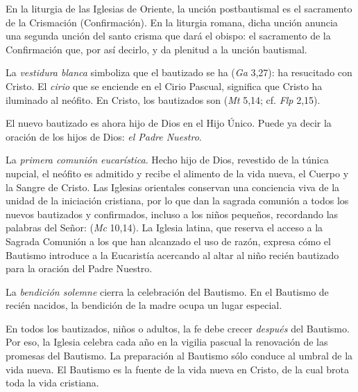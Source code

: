 \begin{ccebody}
 En la liturgia de las Iglesias de Oriente, la unción postbautismal es el sacramento de la Crismación (Confirmación). En la liturgia romana, dicha unción anuncia una segunda unción del santo crisma que dará el obispo: el sacramento de la Confirmación que, por así decirlo,  y da plenitud a la unción bautismal.

 La \textit{vestidura blanca} simboliza que el bautizado se ha  (\textit{Ga} 3,27): ha resucitado con Cristo. El \textit{cirio} que se enciende en el Cirio Pascual, significa que Cristo ha iluminado al neófito. En Cristo, los bautizados son  (\textit{Mt} 5,14; cf. \textit{Flp} 2,15).

El nuevo bautizado es ahora hijo de Dios en el Hijo Único. Puede ya decir la oración de los hijos de Dios: \textit{el Padre Nuestro}.

 La \textit{primera comunión eucarística}. Hecho hijo de Dios, revestido de la túnica nupcial, el neófito es admitido  y recibe el alimento de la vida nueva, el Cuerpo y la Sangre de Cristo. Las Iglesias orientales conservan una conciencia viva de la unidad de la iniciación cristiana, por lo que dan la sagrada comunión a todos los nuevos bautizados y confirmados, incluso a los niños pequeños, recordando las palabras del Señor:  (\textit{Mc} 10,14). La Iglesia latina, que reserva el acceso a la Sagrada Comunión a los que han alcanzado el uso de razón, expresa cómo el Bautismo introduce a la Eucaristía acercando al altar al niño recién bautizado para la oración del Padre Nuestro.

 La \textit{bendición solemne} cierra la celebración del Bautismo. En el Bautismo de recién nacidos, la bendición de la madre ocupa un lugar especial.

 En todos los bautizados, niños o adultos, la fe debe crecer \textit{después} del Bautismo. Por eso, la Iglesia celebra cada año en la vigilia pascual la renovación de las promesas del Bautismo. La preparación al Bautismo sólo conduce al umbral de la vida nueva. El Bautismo es la fuente de la vida nueva en Cristo, de la cual brota toda la vida cristiana.
\end{ccebody}



